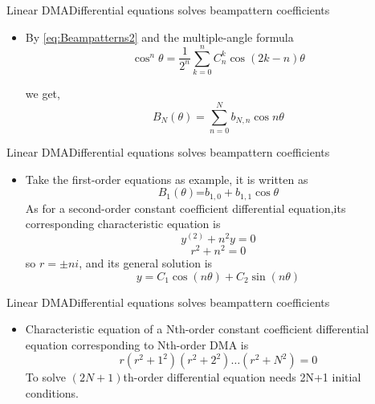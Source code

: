 \documentclass{beamer}
\begin{document}
\begin{frame}{Linear DMA}{Differential equations solves beampattern coefficients}
\begin{itemize}
\item{
By \eqref{eq:Beampatterns2} and the multiple-angle formula
\begin{equation}
{{\cos }^{n}}\theta =\frac{1}{{{2}^{n}}}\sum\limits_{k=0}^{n}{C_{n}^{k}\cos (2k-n)\theta }
\end{equation}

we get,
\begin{equation}
\label{eq:b0}
 {{B}_{N}}(\theta )=\sum\limits_{n=0}^{N}{{{b}_{N,n}}\cos n\theta }
\end{equation}
}
\end{itemize}
	
\end{frame}


\begin{frame}{Linear DMA}{Differential equations solves beampattern coefficients}
\begin{itemize}
\item{
Take the first-order equations as example, it is written as
\begin{equation}
\label{eq:b1}
  {{B}_{1}}(\theta )\text{=}{{b}_{1,0}}+{{b}_{1,1}}\cos \theta 
\end{equation}
As for a second-order constant coefficient differential equation,its corresponding characteristic equation is 
\begin{equation}
\label{eq:d1}
 {{y}^{(2)}}+{{n}^{2}}y=0
\end{equation}
\begin{equation}
 {{r}^{2}}+{{n}^{2}}=0
\end{equation}
so $r=\pm ni$, and its general solution is 
\begin{equation}
\label{eq:solution of d1}
y={{C}_{1}}\cos (n\theta )+{{C}_{2}}\sin (n\theta )
\end{equation}
}
\end{itemize}
	
\end{frame}

\begin{frame}{Linear DMA}{Differential equations solves beampattern coefficients}
\begin{itemize}
\item{
Characteristic equation of a Nth-order constant coefficient differential equation corresponding to Nth-order DMA is
\begin{equation}
  r({{r}^{2}}+{{1}^{2}})({{r}^{2}}+{{2}^{2}})\ldots ({{r}^{2}}+{{N}^{2}})=0
\end{equation}
To solve $(2N+1)$th-order differential equation needs 2N+1 initial conditions.
}
\end{itemize}
	
\end{frame}
\end{document}
